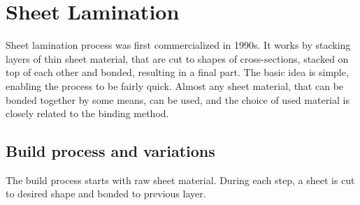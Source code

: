 \documentclass[a4paper, 11pt, reqno]{report}
\begin{document}
\chapter{Sheet Lamination}
Sheet lamination process was first commercialized in 1990s. It works by stacking layers of thin sheet material, that are cut to shapes of cross-sections, stacked on top of each other and bonded, resulting in a final part. The basic idea is simple, enabling the process to be fairly quick. Almost any sheet material, that can be bonded together by some means, can be used, and the choice of used material is closely related to the binding method.

\section{Build process and variations}
The build process starts with raw sheet material. During each step, a sheet is cut to desired shape and bonded to previous layer.
\end{document}
